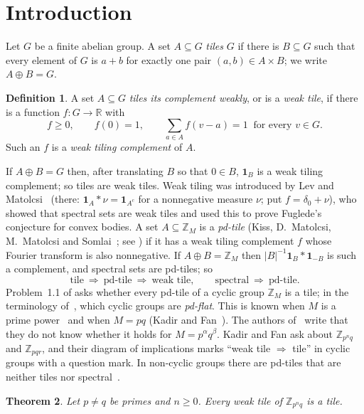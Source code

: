 \documentclass[11pt,a4paper]{amsart}
\newtheorem{theorem}{Theorem}
\theoremstyle{definition}
\newtheorem{definition}[theorem]{Definition}
\theoremstyle{remark}
\newcommand{\Z}{\mathbb{Z}}
\newcommand{\R}{\mathbb{R}}
\newcommand{\one}{\mathbf{1}}
\begin{document}
\section{Introduction}

Let $G$ be a finite abelian group. A set $A\subseteq G$ \emph{tiles} $G$ if there is $B\subseteq G$ such that
every element of $G$ is $a+b$ for exactly one pair $(a,b)\in A\times B$; we write $A\oplus B=G$.

\begin{definition}
A set $A\subseteq G$ \emph{tiles its complement weakly}, or is a \emph{weak tile}, if there is a function
$f\colon G\to\R$ with
\[
 f\ge 0,\qquad f(0)=1,\qquad \sum_{a\in A} f(v-a)=1\ \text{ for every } v\in G .
\]
Such an $f$ is a \emph{weak tiling complement} of $A$.
\end{definition}

If $A\oplus B=G$ then, after translating $B$ so that $0\in B$, $\one_B$ is a weak tiling complement; so tiles are
weak tiles. Weak tiling was introduced by Lev and Matolcsi~\cite{LM} (there: $\one_A*\nu=\one_{A^c}$ for a
nonnegative measure $\nu$; put $f=\delta_0+\nu$), who showed that spectral sets are weak tiles and used this to
prove Fuglede's conjecture for convex bodies. A set $A\subseteq\Z_M$ is a \emph{pd-tile} (Kiss, D.~Matolcsi,
M.~Matolcsi and Somlai~\cite{KMMS}; see \cite{KLMS}) if it has a weak tiling complement $f$ whose Fourier
transform is also nonnegative. If $A\oplus B=\Z_M$ then $|B|^{-1}\one_B*\one_{-B}$ is such a complement, and
spectral sets are pd-tiles; so
\[
 \text{tile}\ \Longrightarrow\ \text{pd-tile}\ \Longrightarrow\ \text{weak tile},\qquad
 \text{spectral}\ \Longrightarrow\ \text{pd-tile}.
\]
Problem~1.1 of \cite{KLMS} asks whether every pd-tile of a cyclic group $\Z_M$ is a tile; in the terminology
of~\cite{KMMS}, which cyclic groups are \emph{pd-flat}. This is known when $M$ is a prime power~\cite{KLMS} and
when $M=pq$ (Kadir and Fan~\cite{KF}). The authors of~\cite{KLMS} write that they do not know whether it holds
for $M=p^\alpha q^\beta$. Kadir and Fan ask about $\Z_{p^nq}$ and $\Z_{pqr}$, and their diagram of implications
marks ``weak tile $\Rightarrow$ tile'' in cyclic groups with a question mark. In non-cyclic groups there are
pd-tiles that are neither tiles nor spectral~\cite{KLMS2}.

\begin{theorem}\label{thm:A}
Let $p\ne q$ be primes and $n\ge 0$. Every weak tile of $\Z_{p^nq}$ is a tile.
\end{theorem}
\end{document}
